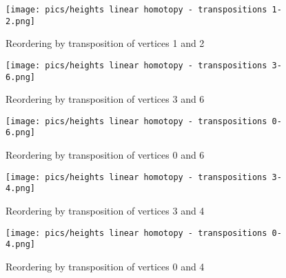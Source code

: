 \documentclass{article}
\begin{document}
\begin{figure}[htbp]
    \centering
    \texttt{[image: pics/heights linear homotopy - transpositions 1-2.png]}
    \caption{Reordering by transposition of vertices 1 and 2}
    \label{fig:transposition1and2}
\end{figure}
\begin{figure}[htbp]
    \centering
    \texttt{[image: pics/heights linear homotopy - transpositions 3-6.png]}
    \caption{Reordering by transposition of vertices 3 and 6}
    \label{fig:transposition3and6}
\end{figure}
\begin{figure}[htbp]
    \centering
    \texttt{[image: pics/heights linear homotopy - transpositions 0-6.png]}
    \caption{Reordering by transposition of vertices 0 and 6}
    \label{fig:transposition0and6}
\end{figure}
\begin{figure}[htbp]
    \centering
    \texttt{[image: pics/heights linear homotopy - transpositions 3-4.png]}
    \caption{Reordering by transposition of vertices 3 and 4}
    \label{fig:transposition3and4}
\end{figure}
\begin{figure}[htbp]
    \centering
    \texttt{[image: pics/heights linear homotopy - transpositions 0-4.png]}
    \caption{Reordering by transposition of vertices 0 and 4}
    \label{fig:transposition0and4}
\end{figure}
\end{document}
